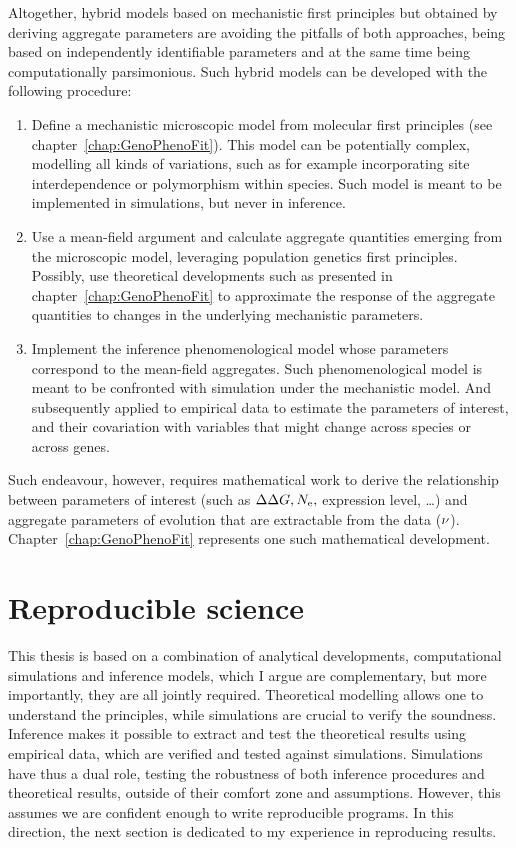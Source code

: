 Altogether, hybrid models based on mechanistic first principles but obtained by deriving aggregate parameters are avoiding the pitfalls of both approaches, being based on independently identifiable parameters and at the same time being computationally parsimonious.
Such hybrid models can be developed with the following procedure:
\begin{enumerate}
    \item Define a mechanistic microscopic model from molecular first principles (see chapter~\ref{chap:GenoPhenoFit}).
    This model can be potentially complex, modelling all kinds of variations, such as for example incorporating site interdependence or polymorphism within species.
    Such model is meant to be implemented in simulations, but never in inference.
    \item Use a mean-field argument and calculate aggregate quantities emerging from the microscopic model, leveraging population genetics first principles.
    Possibly, use theoretical developments such as presented in chapter~\ref{chap:GenoPhenoFit} to approximate the response of the aggregate quantities to changes in the underlying mechanistic parameters.
    \item Implement the inference phenomenological model whose parameters correspond to the mean-field aggregates.
    Such phenomenological model is meant to be confronted with simulation under the mechanistic model.
    And subsequently applied to empirical data to estimate the parameters of interest, and their covariation with variables that might change across species or across genes.
\end{enumerate}
Such endeavour, however, requires mathematical work to derive the relationship between parameters of interest (such as $\Delta \Delta G, N_{\text{e}}, $ expression level, \ldots) and aggregate parameters of evolution that are extractable from the data ($\nu$).
Chapter~\ref{chap:GenoPhenoFit} represents one such mathematical development.

\section{Reproducible science}
\label{sec:reproducible-science}

This thesis is based on a combination of analytical developments, computational simulations and inference models, which I argue are complementary, but more importantly, they are all jointly required.
Theoretical modelling allows one to understand the principles, while simulations are crucial to verify the soundness.
Inference makes it possible to extract and test the theoretical results using empirical data, which are verified and tested against simulations.
Simulations have thus a dual role, testing the robustness of both inference procedures and theoretical results, outside of their comfort zone and assumptions.
However, this assumes we are confident enough to write reproducible programs.
In this direction, the next section is dedicated to my experience in reproducing results.

